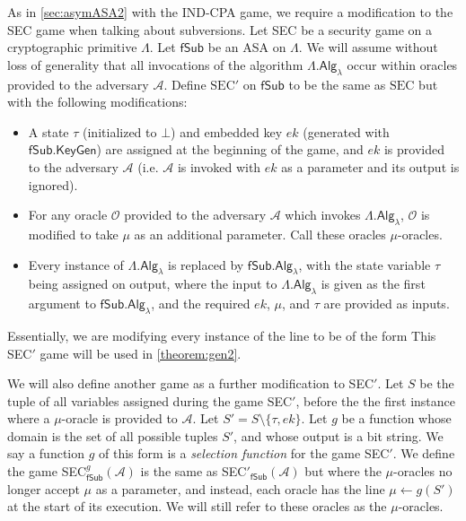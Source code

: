 As in \autoref{sec:asymASA2} with the IND-CPA game, we require a modification to the SEC game when talking about subversions. Let SEC be a security game on a cryptographic primitive $\mathsf{\Lambda}$. Let $\mathsf{fSub}$ be an ASA on $\mathsf{\Lambda}$. We will assume without loss of generality that all invocations of the algorithm $\mathsf{\Lambda.Alg}_\lambda$ occur within oracles provided to the adversary $\mathcal{A}$. Define $\mathrm{SEC'}$ on $\mathsf{fSub}$ to be the same as $\mathrm{SEC}$ but with the following modifications:
\begin{itemize}\itemsep0em
\item A state $\tau$ (initialized to $\bot$) and embedded key $ek$ (generated with $\mathsf{fSub.KeyGen}$) are assigned at the beginning of the game, and $ek$ is provided to the adversary $\mathcal{A}$ (i.e. $\mathcal{A}$ is invoked with $ek$ as a parameter and its output is ignored).
\item For any oracle $\mathcal{O}$ provided to the adversary $\mathcal{A}$ which invokes $\mathsf{\Lambda.Alg}_\lambda$, $\mathcal{O}$ is modified to take $\mu$ as an additional parameter. Call these oracles $\mu$-oracles.
\item Every instance of $\mathsf{\Lambda.Alg}_\lambda$ is replaced by $\mathsf{fSub.Alg}_\lambda$, with the state variable $\tau$ being assigned on output, where the input to $\mathsf{\Lambda.Alg}_\lambda$ is given as the first argument to $\mathsf{fSub.Alg}_\lambda$, and the required $ek$, $\mu$, and $\tau$ are provided as inputs.
\end{itemize}
Essentially, we are modifying every instance of the line 
to be of the form
This SEC$'$ game will be used in \autoref{theorem:gen2}.

We will also define another game as a further modification to SEC$'$. Let $S$ be the tuple of all variables assigned during the game SEC$'$, before the the first instance where a $\mu$-oracle is provided to $\mathcal{A}$. Let $S'=S\setminus \{\tau,ek\}$. Let $g$ be a function whose domain is the set of all possible tuples $S'$, and whose output is a bit string. We say a function $g$ of this form is a \emph{selection function} for the game SEC$'$. We define the game SEC$^g_\mathsf{fSub}(\mathcal{A})$ is the same as SEC$'_\mathsf{fSub}(\mathcal{A})$ but where the $\mu$-oracles no longer accept $\mu$ as a parameter, and instead, each oracle has the line $\mu \leftarrow g(S')$ at the start of its execution. We will still refer to these oracles as the $\mu$-oracles.

